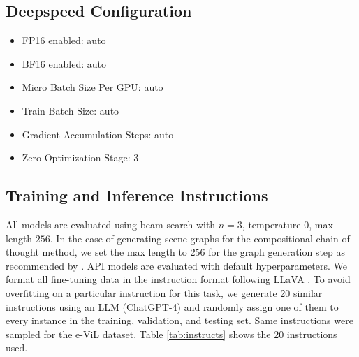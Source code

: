 \subsection*{Deepspeed Configuration}
\begin{itemize}
    \item FP16 enabled: auto
    \item BF16 enabled: auto
    \item Micro Batch Size Per GPU: auto
    \item Train Batch Size: auto
    \item Gradient Accumulation Steps: auto
    \item Zero Optimization Stage: 3
\end{itemize}

\subsection*{Training and Inference Instructions}
All models are evaluated using beam search with $n=3$, temperature $0$, max length $256$. In the case of generating scene graphs for the compositional chain-of-thought method, we set the max length to 256 for the graph generation step as recommended by \citet{mitra2023compositional}. API models are evaluated with default hyperparameters.
We format all fine-tuning data in the instruction format following LLaVA \cite{liu2023improvedllava}. To avoid overfitting on a particular instruction for this task, we generate 20 similar instructions using an LLM (ChatGPT-4) and randomly assign one of them to every instance in the training, validation, and testing set. Same instructions were sampled for the e-ViL dataset. Table \ref{tab:instructs} shows the 20 instructions used.

